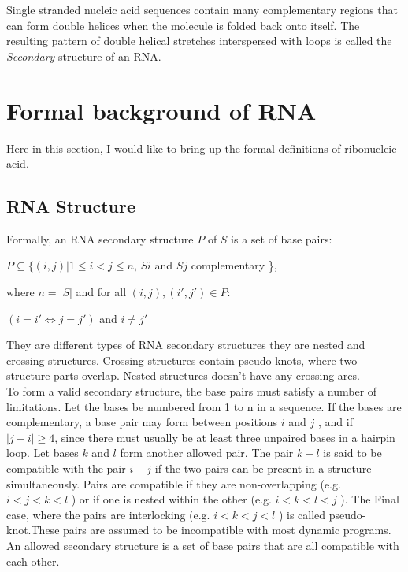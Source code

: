 \documentclass[twoside,a4paper]{report}
\begin{document}
	Single stranded nucleic acid sequences contain many complementary regions that can form double helices when the molecule is folded back onto itself. The resulting pattern of double helical stretches interspersed with loops is called the \textit{Secondary} structure of an RNA.\\
	\section{Formal background of RNA}
	Here in this section, I would like to bring up the formal definitions of ribonucleic acid.
	\subsection{RNA Structure}
	Formally, an RNA secondary structure $P$ of $S$ is a set of base pairs:\\
	\begin{center}
	 $ P \subseteq \{(i, j) | 1 \leq i < j \leq n $, $ Si $ and $Sj$ complementary \},\\
	\end{center}
	where $ n = |S| $ and for all $(i, j) , ( i', j' ) \in  P:$\\
	\begin{center}
	$(i = i' \Leftrightarrow j = j')$ and $ i \neq j'$ \\
	\end{center}

	They are different types of RNA secondary structures they are nested
	and crossing structures. Crossing structures contain pseudo-knots, where two structure parts overlap. Nested structures doesn't have any crossing arcs.\\

	To form a valid secondary structure, the base pairs must satisfy a number of limitations. Let the bases be numbered from 1 to n in a sequence. If the bases are complementary, a base pair may form between positions $i$ and $j$ , and if $|j - i | \geq 4$, since there must usually be at least three unpaired bases in a hairpin loop. Let bases $k$ and $l$ form another allowed pair. The pair $k - l$ is said to be compatible with the pair $i - j$ if the two pairs can be present in a structure simultaneously. Pairs are compatible if they are non-overlapping (e.g. $i<j<k<l$ ) or if one is nested within the other (e.g. $i<k<l<j$ ). The Final case, where the pairs are interlocking (e.g. $i<k<j<l$ ) is called  pseudo-knot.These pairs are assumed to be incompatible with
	most dynamic programs. An allowed secondary structure is a set of base pairs that are all compatible with each other.\\
	
\end{document}
